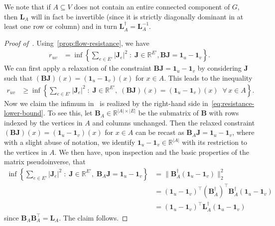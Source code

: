 \documentclass[11pt,a4paper]{amsart}
\begin{document}
We note that if $A\subseteq V$ does not contain an entire connected component of $G$, then $\mathbf{L}_A$ will in fact be invertible (since it is strictly diagonally dominant in at least one row or column) and in turn $\mathbf{L}_A^\dagger = \mathbf{L}_A^{-1}$.

\begin{proof}[Proof of~]
    Using~\cref{prop:flow-resistance}, we have
        \begin{align*}
            r_{uv} &= \inf\left\{\sum_{e\in E'}|\mathbf{J}_e|^2 \;:\; \mathbf{J}\in\mathbb{R}^{E'}, \mathbf{B}\mathbf{J} = \mathbf{1}_u-\mathbf{1}_v \right\}.
        \end{align*}
    We can first apply a relaxation of the constraint $\mathbf{B}\mathbf{J} = \mathbf{1}_u-\mathbf{1}_v$ by considering $\mathbf{J}$ such that $(\mathbf{B}\mathbf{J})(x) = ( \mathbf{1}_u-\mathbf{1}_v )(x)$ for $x\in A$. This leads to the inequality
        \begin{align}\label{eq:relaxed-infimum}
            r_{uv} &\geq \inf\left\{\sum_{e\in E'}|\mathbf{J}_e|^2  \;:\;\mathbf{J}\in\mathbb{R}^{E'},\;(\mathbf{B}\mathbf{J})(x) = ( \mathbf{1}_u-\mathbf{1}_v )(x)\;\;\forall\,x\in A \right\}.
        \end{align}
    Now we claim the infimum in~ is realized by the right-hand side in~\cref{eq:resistance-lower-bound}. To see this, let $\mathbf{B}_A\in\mathbb{R}^{|A|\times |E|}$ be the submatrix of $\mathbf{B}$ with rows indexed by the vertices in $A$ and columns unchanged. Then the relaxed constraint $(\mathbf{B}\mathbf{J})(x) = ( \mathbf{1}_u-\mathbf{1}_v )(x)$ for $x\in A$ can be recast as $\mathbf{B}_A\mathbf{J}= \mathbf{1}_u-\mathbf{1}_v$, where with a slight abuse of notation, we identify $\mathbf{1}_u-\mathbf{1}_v\in\mathbb{R}^{|A|}$ with its restriction to the vertices in $A$. We then have, upon inspection and the basic properties of the matrix pseudoinverse, that
        \begin{align*}
            \inf\left\{\sum_{e\in E'}|\mathbf{J}_e|^2  \;:\;\mathbf{J}\in\mathbb{R}^{E'},\;\mathbf{B}_A\mathbf{J}= \mathbf{1}_u-\mathbf{1}_v\right\} &= \| \mathbf{B}_A^\dagger(\mathbf{1}_u-\mathbf{1}_v)\|_2^2\\
            &= (\mathbf{1}_u-\mathbf{1}_v)^\top (\mathbf{B}_A^\dagger)^\top \mathbf{B}_A^\dagger(\mathbf{1}_u-\mathbf{1}_v)\\
            &= (\mathbf{1}_u-\mathbf{1}_v)^\top \mathbf{L}_A^\dagger (\mathbf{1}_u-\mathbf{1}_v)
        \end{align*}
    since $\mathbf{B}_A \mathbf{B}_A^\top = \mathbf{L}_A$. The claim follows.
\end{proof}
\end{document}
